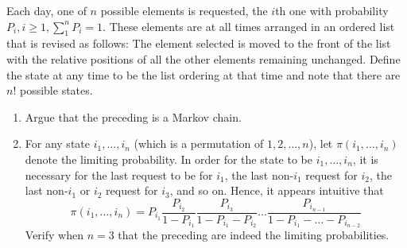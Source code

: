 \begin{exercise}%
\label{ex:markov-chains-43}
Each day, one of $n$ possible elements is requested, the $i$th one with probability $P_i, i \ge 1, \sum_1^n P_i = 1$. These elements are at all times arranged in an ordered list that is revised as follows: The element selected is moved to the front of the list with the relative positions of all the other elements remaining unchanged. Define the state at any time to be the list ordering at that time and note that there are $n!$ possible states.
\begin{enumerate}
\item[(a)] Argue that the preceding is a Markov chain.
\item[(b)] For any state $i_1, \dots, i_n$ (which is a permutation of $1, 2, \dots, n$), let $\pi(i_1, \dots, i_n)$ denote the limiting probability. In order for the state to be $i_1, \dots, i_n$, it is necessary for the last request to be for $i_1$, the last non-$i_1$ request for $i_2$, the last non-$i_1$ or $i_2$ request for $i_3$, and so on. Hence, it appears intuitive that
\[
\pi(i_1, \dots, i_n) = P_{i_1} \frac{P_{i_2}}{1 - P_{i_1}} \frac{P_{i_3}}{1 - P_{i_1} - P_{i_2}} \dots \frac{P_{i_{n-1}}}{1 - P_{i_1} - \dots - P_{i_{n-2}}}
\]
Verify when $n = 3$ that the preceding are indeed the limiting probabilities.
\end{enumerate}
\end{exercise}
